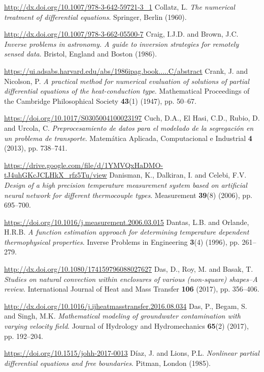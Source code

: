 \begin{thebibliography}{301}
\url{http://dx.doi.org/10.1007/978-3-642-59721-3_1}
%
%
 Collatz, L. {\it The numerical treatment of differential equations}. Springer, Berlin (1960). 

\url{http://dx.doi.org/10.1007/978-3-662-05500-7}
%
%
 Craig, I.J.D. and Brown, J.C. {\it Inverse problems in astronomy. A guide to inversion strategies for remotely sensed data}. Bristol, England and Boston (1986).

\url{https://ui.adsabs.harvard.edu/abs/1986ipag.book.....C/abstract}
%
%
 Crank, J. and Nicolson, P. {\it A practical method for numerical evaluation of solutions of partial differential equations of the heat-conduction type}. Mathematical Proceedings of the Cambridge Philosophical Society {\bf 43}(1) (1947), pp. 50--67.

\url{https://doi.org/10.1017/S0305004100023197}
%
%
 Cuch, D.A., El Hasi, C.D., Rubio, D. and Urcola, C. {\it Preprocesamiento de datos para el modelado de la segregaci\'on en un problema de transporte}. Matem\'atica Aplicada, Computacional e Industrial {\bf 4} (2013), pp. 738--741.

\url{https://drive.google.com/file/d/1YMVQxHaDMO-tJ4uhGKcJCLHkX_rfz5Tu/view}
%
%
 Danisman, K., Dalkiran, I. and Celebi, F.V. {\it Design of a high precision temperature measurement system based on artificial neural network for different thermocouple types}. Measurement {\bf 39}(8) (2006), pp. 695--700.

\url{https://doi.org/10.1016/j.measurement.2006.03.015}
%
%
 Dantas, L.B. and Orlande, H.R.B. {\it A function estimation approach for determining temperature dependent
thermophysical properties}. Inverse Problems in Engineering {\bf 3}(4) (1996), pp. 261--279.

\url{http://dx.doi.org/10.1080/174159796088027627}
%
%
 Das, D., Roy, M. and Basak, T. {\it Studies on natural convection within enclosures of various (non-square) shapes--A review}. International Journal of Heat and Mass Transfer {\bf 106} (2017), pp. 356--406.

\url{http://dx.doi.org/10.1016/j.ijheatmasstransfer.2016.08.034}
%
%
 Das, P., Begam, S. and Singh, M.K. {\it Mathematical modeling of groundwater contamination with varying velocity field}. Journal of Hydrology and Hydromechanics {\bf 65}(2) (2017), pp. 192--204.

\url{https://doi.org/10.1515/johh-2017-0013}
%
%
 D\'iaz, J. and Lions, P.L. {\it Nonlinear partial differential equations and free boundaries}. Pitman, London (1985). 


\end{thebibliography}

